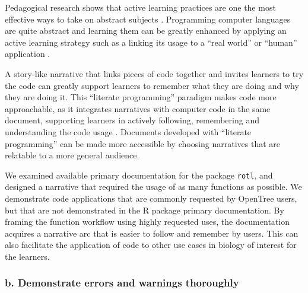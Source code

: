 \documentclass[12pt]{article}
\begin{document}
Pedagogical research shows that active learning practices are one the most effective
ways to take on abstract subjects \citep{freeman2014active}.
Programming computer languages are quite abstract and learning them can be greatly
enhanced by applying an active learning strategy such as a linking its usage to
a ``real world'' or ``human'' application \citep{felder2009active}.

A story-like narrative that links pieces of code together and invites learners
to try the code can greatly support learners to remember what they are doing and
why they are doing it.
This ``literate programming'' paradigm \citep{knuth1984literate, fritzson2002mathmodelica}
makes code more approachable, as it integrates narratives with computer code in
the same document, supporting learners in actively following, remembering and understanding
the code usage \citep{piccolo2016tools}.
Documents developed with ``literate programming'' can be made more accessible by
choosing narratives that are relatable to a more general audience.

We examined available primary documentation for the package \texttt{rotl},
and designed a narrative that required the usage of as many functions as possible.
We demonstrate code applications that are commonly requested by OpenTree users,
but that are not demonstrated in the R package primary documentation.
By framing the function workflow using highly requested uses, the documentation acquires a
narrative arc that is easier to follow and remember by users. This can also facilitate the application
of code to other use cases in biology of interest for the learners.


\subsubsection*{b. Demonstrate errors and warnings thoroughly}
\end{document}
